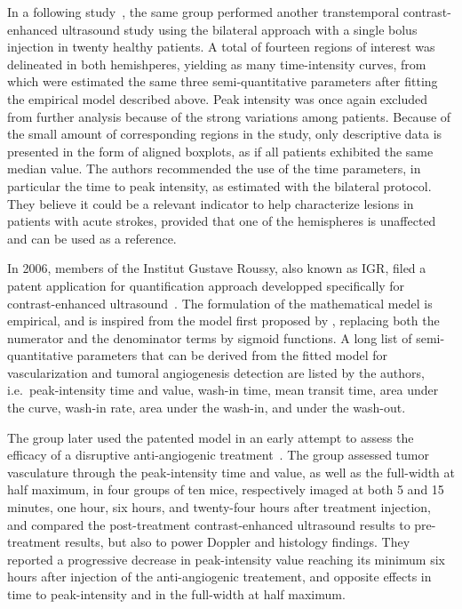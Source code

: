 In a following study~\cite{Krogias:2005hs}, the same group performed another transtemporal contrast-enhanced ultrasound study using the bilateral approach with a single bolus injection in twenty healthy patients.
A total of fourteen regions of interest was delineated in both hemishperes, yielding as many time-intensity curves, from which were estimated the same three semi-quantitative parameters after fitting the empirical model described above. 
Peak intensity was once again excluded from further analysis because of the strong variations among patients.
Because of the small amount of corresponding regions in the study, only descriptive data is presented in the form of aligned boxplots, as if all patients exhibited the same median value. 
The authors recommended the use of the time parameters, in particular the time to peak intensity, as estimated with the bilateral protocol.
They believe it could be a relevant indicator to help characterize lesions in patients with acute strokes, provided that one of the hemispheres is unaffected and can be used as a reference.

In 2006, members of the Institut Gustave Roussy, also known as IGR, filed a patent application for quantification approach developped specifically for contrast-enhanced ultrasound~\cite{Elie2014}.
The formulation of the mathematical medel is empirical, and is inspired from the model first proposed by \citet{Eyding:2003bo}, replacing both the numerator and the denominator terms by sigmoid functions. 
A long list of semi-quantitative parameters that can be derived from the fitted model for vascularization and tumoral angiogenesis detection are listed by the authors, i.e.~peak-intensity time and value, wash-in time, mean transit time, area under the curve, wash-in rate, area under the wash-in, and under the wash-out. 

The group later used the patented model in an early attempt to assess the efficacy of a disruptive anti-angiogenic treatment~\cite{Lavisse:2008gc}.
The group assessed tumor vasculature through the peak-intensity time and value, as well as the full-width at half maximum, in four groups of ten mice, respectively imaged at both 5 and 15 minutes, one hour, six hours, and twenty-four hours after treatment injection, and compared the post-treatment contrast-enhanced ultrasound results to pre-treatment results, but also to power Doppler and histology findings.
They reported a progressive decrease in peak-intensity value reaching its minimum six hours after injection of the anti-angiogenic treatement, and opposite effects in time to peak-intensity and in the full-width at half maximum.

